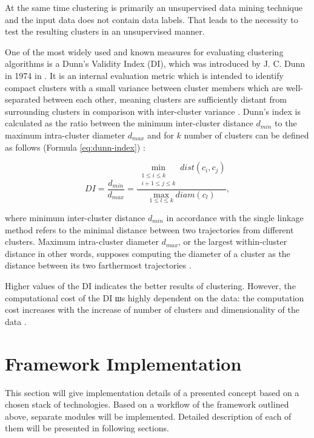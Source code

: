 At the same time clustering is primarily an unsupervised data mining technique and the input data does not contain data labels. That leads to the necessity to test the resulting clusters in an unsupervised manner. 

One of the most widely used and known measures for evaluating clustering algorithms is a Dunn's Validity Index (DI), which was introduced by J. C. Dunn in 1974 in \cite{article:dunn_orig}. It is an internal evaluation metric which is intended to identify compact clusters with a small variance between cluster members which are well-separated between each other, meaning clusters are sufficiently distant from surrounding clusters in comparison with inter-cluster variance \cite{online:hier_clust_r}. Dunn's index is calculated as the ratio between the minimum inter-cluster distance $d_{min}$ to the maximum intra-cluster diameter $d_{max}$ and for $k$ number of clusters can be defined as follows (Formula \ref{eq:dunn-index}) \cite{article:quant_eval_perf_clust}:

\begin{equation} \label{eq:dunn-index}
	DI = \frac {d_{min}} {d_{max}} = \frac{\min\limits_{\substack{1 \leq i \leq k \\ i+1 \leq j \leq k}} dist(c_i, c_j)} {\max\limits_{1 \leq l \leq k} diam(c_l)}, 
\end{equation}

where minimum inter-cluster distance $d_{min}$ in accordance with the single linkage method refers to the minimal distance between two trajectories from different clusters. Maximum intra-cluster diameter $d_{max}$, or the largest within-cluster distance in other words, supposes computing the diameter of a cluster as the distance between its two farthermost trajectories \cite{inproceedings:clust_ind}. 

Higher values of the DI indicates the better results of clustering. However, the computational cost of the DI шs highly dependent on the data: the computation cost increases with the increase of number of clusters and dimensionality of the data \cite{online:dunn_cl_valid}.

\section{Framework Implementation}

This section will give implementation details of a presented concept based on a chosen stack of technologies. Based on a workflow of the framework outlined above, separate modules will be implemented. Detailed description of each of them will be presented in following sections.


